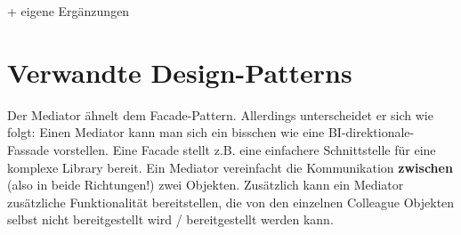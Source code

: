 \autocite[vgl.][S. 273ff]{gangoffour_book} + eigene Ergänzungen
% 
\section{Verwandte Design-Patterns}
Der Mediator ähnelt dem Facade-Pattern. Allerdings unterscheidet er sich wie folgt: Einen Mediator kann man sich ein bisschen wie eine BI-direktionale-Fassade vorstellen. Eine Facade stellt z.B. eine einfachere Schnittstelle für eine komplexe Library bereit. Ein Mediator vereinfacht die Kommunikation \textbf{zwischen} (also in beide Richtungen!) zwei Objekten. Zusätzlich kann ein Mediator zusätzliche Funktionalität bereitstellen, die von den einzelnen Colleague Objekten selbst nicht bereitgestellt wird / bereitgestellt werden kann. 
\autocite[vgl.][S. 273ff]{gangoffour_book}